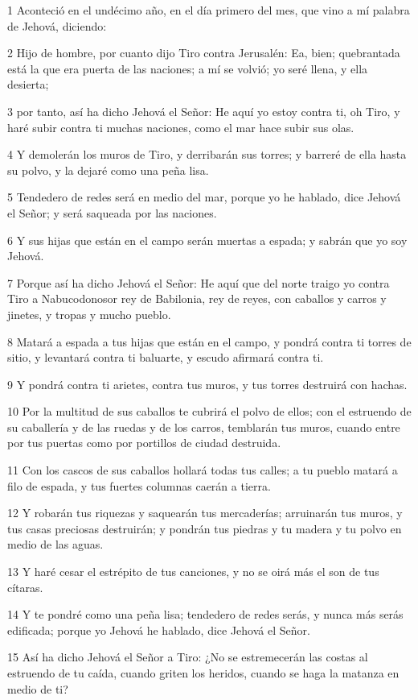 \par 1 Aconteció en el undécimo año, en el día primero del mes, que vino a mí palabra de Jehová, diciendo:
\par 2 Hijo de hombre, por cuanto dijo Tiro contra Jerusalén: Ea, bien; quebrantada está la que era puerta de las naciones; a mí se volvió; yo seré llena, y ella desierta;
\par 3 por tanto, así ha dicho Jehová el Señor: He aquí yo estoy contra ti, oh Tiro, y haré subir contra ti muchas naciones, como el mar hace subir sus olas.
\par 4 Y demolerán los muros de Tiro, y derribarán sus torres; y barreré de ella hasta su polvo, y la dejaré como una peña lisa.
\par 5 Tendedero de redes será en medio del mar, porque yo he hablado, dice Jehová el Señor; y será saqueada por las naciones.
\par 6 Y sus hijas que están en el campo serán muertas a espada; y sabrán que yo soy Jehová.
\par 7 Porque así ha dicho Jehová el Señor: He aquí que del norte traigo yo contra Tiro a Nabucodonosor rey de Babilonia, rey de reyes, con caballos y carros y jinetes, y tropas y mucho pueblo.
\par 8 Matará a espada a tus hijas que están en el campo, y pondrá contra ti torres de sitio, y levantará contra ti baluarte, y escudo afirmará contra ti.
\par 9 Y pondrá contra ti arietes, contra tus muros, y tus torres destruirá con hachas.
\par 10 Por la multitud de sus caballos te cubrirá el polvo de ellos; con el estruendo de su caballería y de las ruedas y de los carros, temblarán tus muros, cuando entre por tus puertas como por portillos de ciudad destruida.
\par 11 Con los cascos de sus caballos hollará todas tus calles; a tu pueblo matará a filo de espada, y tus fuertes columnas caerán a tierra.
\par 12 Y robarán tus riquezas y saquearán tus mercaderías; arruinarán tus muros, y tus casas preciosas destruirán; y pondrán tus piedras y tu madera y tu polvo en medio de las aguas.
\par 13 Y haré cesar el estrépito de tus canciones, y no se oirá más el son de tus cítaras. 
\par 14 Y te pondré como una peña lisa; tendedero de redes serás, y nunca más serás edificada; porque yo Jehová he hablado, dice Jehová el Señor.
\par 15 Así ha dicho Jehová el Señor a Tiro: ¿No se estremecerán las costas al estruendo de tu caída, cuando griten los heridos, cuando se haga la matanza en medio de ti?
